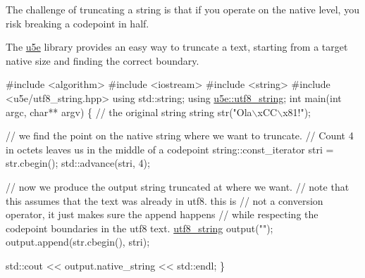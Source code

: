 The challenge of truncating a string is that if you operate on the native level, you risk breaking a codepoint in half.

The \hyperlink{namespaceu5e}{u5e} library provides an easy way to truncate a text, starting from a target native size and finding the correct boundary.


\begin{DoxyCode}
\textcolor{preprocessor}{#include <algorithm>}
\textcolor{preprocessor}{#include <iostream>}
\textcolor{preprocessor}{#include <string>}
\textcolor{preprocessor}{#include <u5e/utf8\_string.hpp>}
\textcolor{keyword}{using} std::string;
\textcolor{keyword}{using} \hyperlink{namespaceu5e_a3814526c6ea7ca04223a8ec1b662d497}{u5e::utf8\_string};
\textcolor{keywordtype}{int} main(\textcolor{keywordtype}{int} argc, \textcolor{keywordtype}{char}** argv) \{
  \textcolor{comment}{// the original string}
  \textcolor{keywordtype}{string} str(\textcolor{stringliteral}{"Ola\(\backslash\)xCC\(\backslash\)x81!"});

  \textcolor{comment}{// we find the point on the native string where we want to truncate.}
  \textcolor{comment}{// Count 4 in octets leaves us in the middle of a codepoint}
  string::const\_iterator stri = str.cbegin();
  std::advance(stri, 4);
  
  \textcolor{comment}{// now we produce the output string truncated at where we want.}
  \textcolor{comment}{// note that this assumes that the text was already in utf8. this is}
  \textcolor{comment}{// not a conversion operator, it just makes sure the append happens}
  \textcolor{comment}{// while respecting the codepoint boundaries in the utf8 text.}
  \hyperlink{namespaceu5e_a3814526c6ea7ca04223a8ec1b662d497}{utf8\_string} output(\textcolor{stringliteral}{""});
  output.append(str.cbegin(), stri);

  std::cout << output.native\_string << std::endl;
\}
\end{DoxyCode}
 